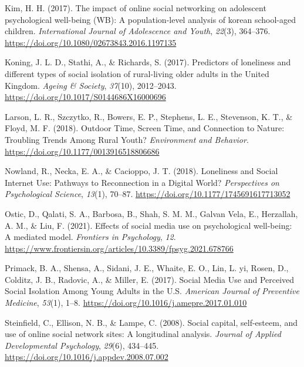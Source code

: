 \documentclass[]{interact}
\theoremstyle{plain}%
\theoremstyle{definition}
\theoremstyle{remark}
\newlength{\cslhangindent}
\newlength{\cslentryspacingunit} %
\newenvironment{CSLReferences}[2] %
 {%
  \setlength{\parindent}{0pt}
  \ifodd #1
  \let\oldpar\par
  \def\par{\hangindent=\cslhangindent\oldpar}
  \fi
  \setlength{\parskip}{#2\cslentryspacingunit}
 }%
 {}
\begin{document}
\begin{CSLReferences}{1}{0}
\leavevmode{}%
Kim, H. H. (2017). The impact of online social networking on adolescent
psychological well-being (WB): A population-level analysis of korean
school-aged children. \emph{International Journal of Adolescence and
Youth}, \emph{22}(3), 364--376.
\url{https://doi.org/10.1080/02673843.2016.1197135}

\leavevmode{}%
Koning, J. L. D., Stathi, A., \& Richards, S. (2017). Predictors of
loneliness and different types of social isolation of rural-living older
adults in the United Kingdom. \emph{Ageing \& Society}, \emph{37}(10),
2012--2043. \url{https://doi.org/10.1017/S0144686X16000696}

\leavevmode{}%
Larson, L. R., Szczytko, R., Bowers, E. P., Stephens, L. E., Stevenson,
K. T., \& Floyd, M. F. (2018). Outdoor Time, Screen Time, and Connection
to Nature: Troubling Trends Among Rural Youth? \emph{Environment and
Behavior}. \url{https://doi.org/10.1177/0013916518806686}

\leavevmode{}%
Nowland, R., Necka, E. A., \& Cacioppo, J. T. (2018). Loneliness and
Social Internet Use: Pathways to Reconnection in a Digital World?
\emph{Perspectives on Psychological Science}, \emph{13}(1), 70--87.
\url{https://doi.org/10.1177/1745691617713052}

\leavevmode{}%
Ostic, D., Qalati, S. A., Barbosa, B., Shah, S. M. M., Galvan Vela, E.,
Herzallah, A. M., \& Liu, F. (2021). Effects of social media use on
psychological well-being: A mediated model. \emph{Frontiers in
Psychology}, \emph{12}.
\url{https://www.frontiersin.org/articles/10.3389/fpsyg.2021.678766}

\leavevmode{}%
Primack, B. A., Shensa, A., Sidani, J. E., Whaite, E. O., Lin, L. yi,
Rosen, D., Colditz, J. B., Radovic, A., \& Miller, E. (2017). Social
Media Use and Perceived Social Isolation Among Young Adults in the U.S.
\emph{American Journal of Preventive Medicine}, \emph{53}(1), 1--8.
\url{https://doi.org/10.1016/j.amepre.2017.01.010}

\leavevmode{}%
Steinfield, C., Ellison, N. B., \& Lampe, C. (2008). Social capital,
self-esteem, and use of online social network sites: A longitudinal
analysis. \emph{Journal of Applied Developmental Psychology},
\emph{29}(6), 434--445.
\url{https://doi.org/10.1016/j.appdev.2008.07.002}


\end{CSLReferences}
\end{document}
